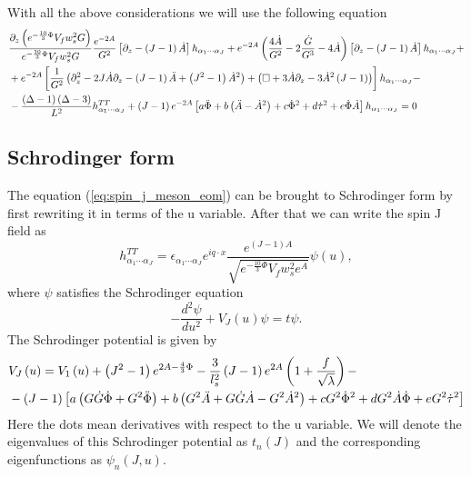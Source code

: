 \documentclass[a4paper,12pt]{article}
\begin{document}
With all the above considerations we will use the following equation
\begin{align}
&\frac{\partial_z \left(e^{-\frac{10}{3}\Phi} V_f w_s^2 G\right)}{e^{-\frac{10}{3}\Phi} V_f w_s^2 G} \frac{e^{-2A}}{G^2} \left[\partial_z - \left(J-1\right) \dot{A} \right]h_{\alpha_1 \cdots \alpha_J} + e^{-2A}\left( \frac{4 \dot{A}}{G^2} - 2 \frac{\dot{G}}{G^3} - 4 \dot{A} \right) \left[\partial_z - \left(J-1\right) \dot{A} \right]h_{\alpha_1  \cdots \alpha_J} + \notag \\
&+e^{-2A} \left[\frac{1}{G^2}\left(\partial_z^2 - 2 J \dot{A} \partial_z - \left(J-1\right) \ddot{A} + \left(J^2-1\right) {\dot{A}}^2 \right)+ \left( \Box + 3\dot{A} \partial_z - 3 {\dot{A}}^2 \left(J-1\right) \right)  \right]h_{\alpha_1 \cdots \alpha_J} - \notag \\
& - \frac{\left(\Delta - 1 \right)\left(\Delta - 3\right)}{L^2} h_{\alpha_1 \cdots \alpha_J}^{TT} + \left(J-1\right) e^{-2A} \left[ a \ddot{\Phi} + b \left(\ddot{A} - {\dot{A}}^2\right) + c {\dot{\Phi}}^2 + d {\dot{\tau}}^2 + e \dot{\Phi} \dot{A} \right] h_{\alpha_1 \cdots \alpha_J} = 0
\label{eq:spin_j_meson_eom}
\end{align}

\subsection{Schrodinger form}
The equation (\ref{eq:spin_j_meson_eom}) can be brought to Schrodinger form by first rewriting it in terms of the u variable. After that we can write the spin J field as
\begin{equation}
h^{TT}_{\alpha_1 \cdots \alpha_J} = \epsilon_{\alpha_1 \cdots \alpha_J} e^{i q \cdot x} \frac{e^{\left(J-1\right)A}}{\sqrt{e^{-\frac{10}{3}\Phi}V_f w_s^2 e^A}} \psi\left(u\right),
\end{equation}
where $\psi$ satisfies the Schrodinger equation
\begin{equation}
- \frac{d^2 \psi}{du^2} + V_J \left(u\right) \psi = t \psi.
\end{equation}
The Schrodinger potential is given by
\begin{align}
&V_J\left(u\right) = V_1\left(u\right) + \left(J^2 - 1\right) e^{2 A - \frac{4}{3} \Phi} - \frac{3}{l_s^2} \left(J-1\right) e^{2A} \left(1 + \frac{f}{\sqrt{\lambda}}\right) - \notag \\
& - \left(J-1\right) \left[a \left( G \dot{G} \dot{\Phi} + G^2 \ddot{\Phi} \right) + b \left( G^2 \ddot{A} + G \dot{G} \dot{A} -G^2 \dot{A}^2\right) +c G^2 \dot{\Phi}^2 + d G^2 \dot{A}\dot{\Phi} + e G^2 \dot{\tau}^2 \right]
\label{eq:meson_schrodinger_potential}
\end{align}
Here the dots mean derivatives with respect to the u variable.
We will denote the eigenvalues of this Schrodinger potential as $t_n\left(J\right)$ and the corresponding eigenfunctions as $\psi_n\left(J, u\right)$.
\end{document}

